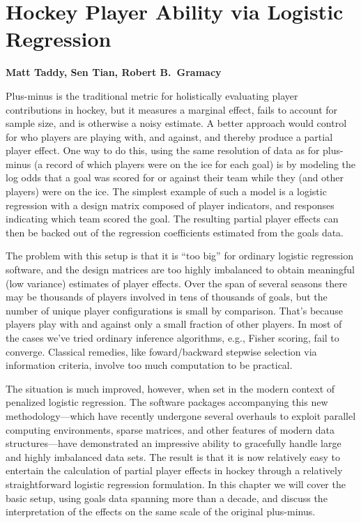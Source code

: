 
\chapter{Hockey Player Ability via Logistic Regression}

\noindent
{\bf Matt Taddy, Sen Tian, Robert B.~Gramacy}

\bigskip
Plus-minus is the traditional metric for holistically evaluating player
contributions in hockey, but it measures a marginal effect, fails to account
for sample size, and is otherwise a noisy estimate.  A better approach would
control for who players are playing with, and against, and thereby produce a
partial player effect.  One way to do this, using the same resolution of data
as for plus-minus (a record of which players were on the ice for each goal) is
by modeling the log odds that a goal was scored for or against their team
while they (and other players) were on the ice.  The simplest example of such
a model is a logistic regression with a design matrix composed of player
indicators, and responses indicating which team scored the goal.  The
resulting partial player effects can then be backed out of the regression
coefficients estimated from the goals data. 

The problem with this setup is that it is ``too big'' for ordinary logistic
regression software, and the design matrices are too highly imbalanced to
obtain meaningful (low variance) estimates of player effects.  Over the span
of several seasons there may be thousands of players involved in tens of
thousands of goals, but the number of unique player configurations is small by
comparison. That's because players play with and against only a small fraction
of other players.  In most of the cases we've tried ordinary inference
algorithms, e.g., Fisher scoring, fail to converge.  Classical remedies, like
foward/backward stepwise selection via information criteria, involve too much
computation to be practical.

The situation is much improved, however, when set in the modern context of
penalized logistic regression.  The software packages accompanying this new
methodology---which have recently undergone several overhauls to exploit
parallel computing environments, sparse matrices, and other features of modern
data structures---have demonstrated an impressive ability to gracefully handle
large and highly imbalanced data sets.  The result is that it is now relatively
easy to entertain the calculation of partial player effects in hockey through
a relatively straightforward logistic regression formulation.  In this chapter
we will cover the basic setup, using goals data spanning more than a decade,
and discuss the interpretation of the effects on the same scale of the
original plus-minus.  

